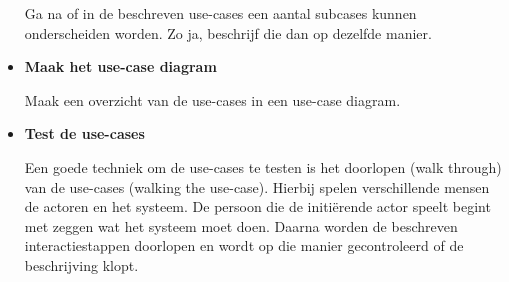 \begin{itemize}
Ga na of in de beschreven use-cases een aantal subcases kunnen onderscheiden worden. Zo ja, beschrijf die dan op dezelfde manier.
\item \textbf{Maak het use-case diagram}

Maak een overzicht van de use-cases in een use-case diagram.
\item \textbf{Test de use-cases}

Een goede techniek om de use-cases te testen is het doorlopen (walk through) van de use-cases (walking the use-case). Hierbij spelen verschillende mensen de actoren en het systeem. De persoon die de initiërende actor speelt begint met zeggen wat het systeem moet doen. Daarna worden de beschreven interactiestappen doorlopen en wordt op die manier gecontroleerd of de beschrijving klopt.

\end{itemize}


